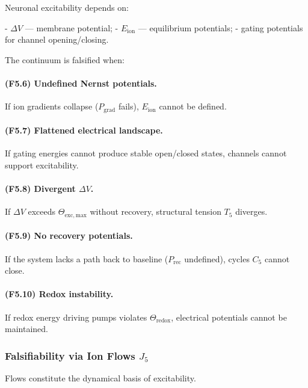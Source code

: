 Neuronal excitability depends on:

- $\Delta V$ — membrane potential;
- $E_{\mathrm{ion}}$ — equilibrium potentials;
- gating potentials for channel opening/closing.

The continuum is falsified when:

\paragraph{(F5.6) Undefined Nernst potentials.}
If ion gradients collapse ($P_{\mathrm{grad}}$ fails),
$E_{\mathrm{ion}}$ cannot be defined.

\paragraph{(F5.7) Flattened electrical landscape.}
If gating energies cannot produce stable open/closed states,
channels cannot support excitability.

\paragraph{(F5.8) Divergent \texorpdfstring{$\Delta V$}{\Delta V}.}
If $\Delta V$ exceeds $\Theta_{\mathrm{exc,max}}$ without recovery,
structural tension $T_5$ diverges.

\paragraph{(F5.9) No recovery potentials.}
If the system lacks a path back to baseline
($P_{\mathrm{rec}}$ undefined), cycles $C_5$ cannot close.

\paragraph{(F5.10) Redox instability.}
If redox energy driving pumps violates $\Theta_{\mathrm{redox}}$,
electrical potentials cannot be maintained.



\subsubsection{Falsifiability via Ion Flows \texorpdfstring{$J_5$}{J_5}}

Flows constitute the dynamical basis of excitability.

